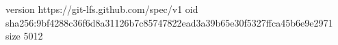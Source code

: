 version https://git-lfs.github.com/spec/v1
oid sha256:9bf4288c36f6d8a31126b7c85747822ead3a39b65e30f5327ffca45b6e9e2971
size 5012
